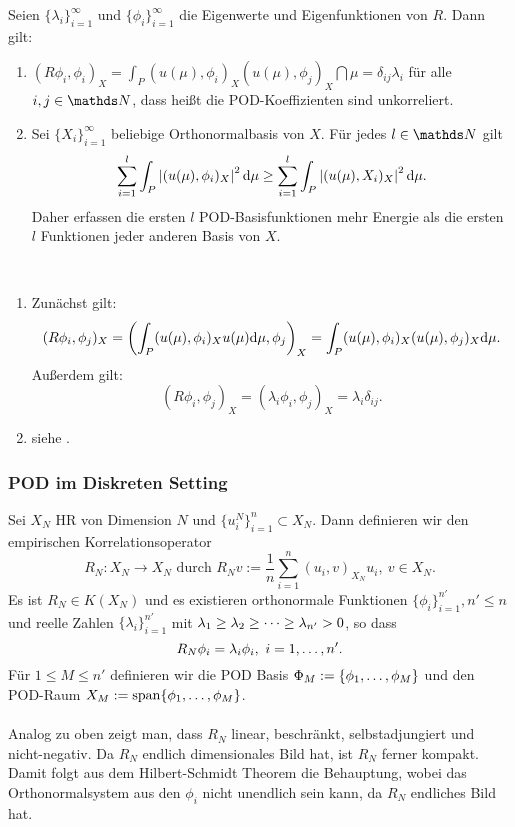 Seien $\{\lambda_i\}_{i=1}^\infty$ und $\{\phi_i\}_{i=1}^\infty$ die Eigenwerte und Eigenfunktionen von $R$.
Dann gilt:
\begin{enumerate}[(1)]
	\item $(R\phi_i,\phi_i)_X = \int_P (u(\mu),\phi_i)_X (u(\mu),\phi_j)_X \dint\mu = \delta_{ij}\lambda_i$ für alle $i,j\in \N$, dass heißt die POD-Koeffizienten sind unkorreliert.
	\item Sei $\{X_i\}_{i=1}^\infty$ beliebige Orthonormalbasis von $X$.
	Für jedes $l\in \N$ gilt
	\[
	\sum_{i=1}^{l} \int_P \left\vert(u(\mu),\phi_i)_X\right\vert^2\mathrm{d}\mu \ge \sum_{i=1}^{l} \int_P \left\vert(u(\mu),X_i)_X\right\vert^2\mathrm{d}\mu.
	\]
	Daher erfassen die ersten $l$ POD-Basisfunktionen mehr Energie als die ersten $l$ Funktionen jeder anderen Basis von $X$.
\end{enumerate}

\\
\begin{enumerate}[(1)]
	\item Zunächst gilt: 
	\[
	(R\phi_i,\phi_j)_X = \left( \int_P (u(\mu),\phi_i)_X u(\mu) \mathrm{d}\mu,\phi_j\right)_X = \int_P (u(\mu),\phi_i)_X (u(\mu),\phi_j)_X \mathrm{d}\mu.
	\]
	Außerdem gilt:
	\[
	(R\phi_i,\phi_j)_X = (\lambda_i\phi_i,\phi_j)_X = \lambda_i \delta_{ij}.
	\]
	\item siehe \cite{HoLuBeRo12}.
\end{enumerate}

\subsubsection{POD im Diskreten Setting}

Sei $X_N$ HR von Dimension $N$ und $\{u_i^N\}_{i=1}^n\subset X_N$.
Dann definieren wir den empirischen Korrelationsoperator
\[
R_N: X_N\to X_N \text{ durch } R_N v := \frac{1}{n} \sum_{i=1}^{n} (u_i,v)_{X_N} u_i ,~ v\in X_N.
\]
Es ist $R_N\in K(X_N)$ und es existieren orthonormale Funktionen $\{\phi_i\}_{i=1}^{n'}, n'\le n$ und reelle Zahlen $\{\lambda_i\}_{i=1}^{n'}$ mit $\lambda_1\ge \lambda_2\ge \dots \ge \lambda_{n'}> 0$, so dass
\[
R_N\phi_i = \lambda_i\phi_i,~i=1, \dots , n'.
\]
Für $1\le M\le n'$ definieren wir die POD Basis $\Phi_M := \{\phi_1, \dots ,\phi_M\}$ und den POD-Raum $X_M:= \operatorname{span}\{\phi_1, \dots ,\phi_M\}$.\\

\\
Analog zu oben zeigt man, dass $R_N$ linear, beschränkt, selbstadjungiert und nicht-negativ.
Da $R_N$ endlich dimensionales Bild hat, ist $R_N$ ferner kompakt.
Damit folgt aus dem Hilbert-Schmidt Theorem die Behauptung, wobei das Orthonormalsystem aus den $\phi_i$ nicht unendlich sein kann, da $R_N$ endliches Bild hat.

